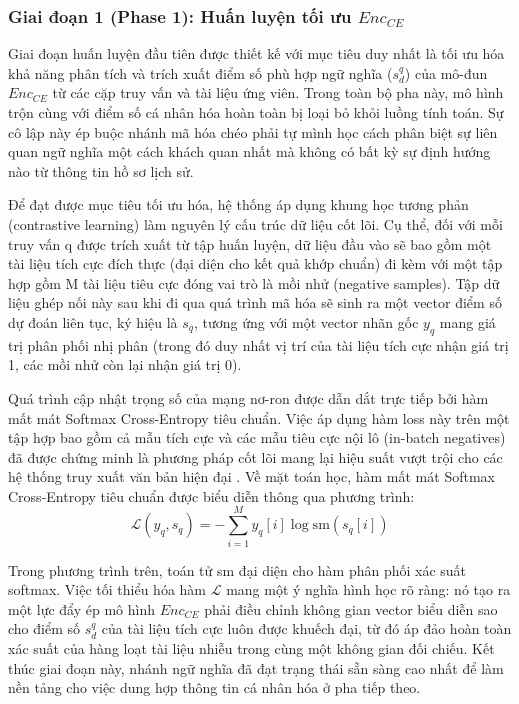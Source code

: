 \subsubsection*{Giai đoạn 1 (Phase 1): Huấn luyện tối ưu $Enc_{CE}$}

Giai đoạn huấn luyện đầu tiên được thiết kế với mục tiêu duy nhất là tối ưu hóa khả năng phân tích và trích xuất điểm số phù hợp ngữ nghĩa ($s_d^q$) của mô-đun $Enc_{CE}$ từ các cặp truy vấn và tài liệu ứng viên. Trong toàn bộ pha này, mô hình trộn cùng với điểm số cá nhân hóa hoàn toàn bị loại bỏ khỏi luồng tính toán. Sự cô lập này ép buộc nhánh mã hóa chéo phải tự mình học cách phân biệt sự liên quan ngữ nghĩa một cách khách quan nhất mà không có bất kỳ sự định hướng nào từ thông tin hồ sơ lịch sử.

Để đạt được mục tiêu tối ưu hóa, hệ thống áp dụng khung học tương phản (contrastive learning) làm nguyên lý cấu trúc dữ liệu cốt lõi. Cụ thể, đối với mỗi truy vấn q được trích xuất từ tập huấn luyện, dữ liệu đầu vào sẽ bao gồm một tài liệu tích cực đích thực (đại diện cho kết quả khớp chuẩn) đi kèm với một tập hợp gồm M tài liệu tiêu cực đóng vai trò là mồi nhử (negative samples). Tập dữ liệu ghép nối này sau khi đi qua quá trình mã hóa sẽ sinh ra một vector điểm số dự đoán liên tục, ký hiệu là $s_q$, tương ứng với một vector nhãn gốc $y_q$ mang giá trị phân phối nhị phân (trong đó duy nhất vị trí của tài liệu tích cực nhận giá trị 1, các mồi nhử còn lại nhận giá trị 0).

Quá trình cập nhật trọng số của mạng nơ-ron được dẫn dắt trực tiếp bởi hàm mất mát Softmax Cross-Entropy tiêu chuẩn. Việc áp dụng hàm loss này trên một tập hợp bao gồm cả mẫu tích cực và các mẫu tiêu cực nội lô (in-batch negatives) đã được chứng minh là phương pháp cốt lõi mang lại hiệu suất vượt trội cho các hệ thống truy xuất văn bản hiện đại \cite{22}. Về mặt toán học, hàm mất mát Softmax Cross-Entropy tiêu chuẩn \cite{22} được biểu diễn thông qua phương trình:
$$\mathcal{L}(y_q, s_q) = - \sum_{i=1}^M y_q[i] \log \text{sm}(s_q[i])$$

Trong phương trình trên, toán tử sm đại diện cho hàm phân phối xác suất softmax. Việc tối thiểu hóa hàm $\mathcal{L}$ mang một ý nghĩa hình học rõ ràng: nó tạo ra một lực đẩy ép mô hình $Enc_{CE}$ phải điều chỉnh không gian vector biểu diễn sao cho điểm số $s_d^q$ của tài liệu tích cực luôn được khuếch đại, từ đó áp đảo hoàn toàn xác suất của hàng loạt tài liệu nhiễu trong cùng một không gian đối chiếu. Kết thúc giai đoạn này, nhánh ngữ nghĩa đã đạt trạng thái sẵn sàng cao nhất để làm nền tảng cho việc dung hợp thông tin cá nhân hóa ở pha tiếp theo.


